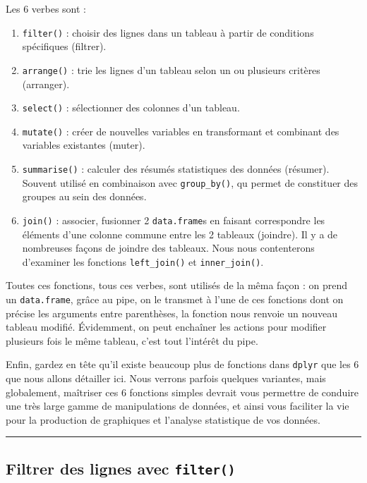 \documentclass[a4paperpaper,]{article}
\providecommand{\tightlist}{%
  \setlength{\itemsep}{0pt}\setlength{\parskip}{0pt}}
\theoremstyle{definition}
\theoremstyle{definition}
\theoremstyle{definition}
\theoremstyle{remark}
\begin{document}
Les 6 verbes sont :

\begin{enumerate}
\def\labelenumi{\arabic{enumi}.}
\tightlist
\item
  \texttt{filter()} : choisir des lignes dans un tableau à partir de
  conditions spécifiques (filtrer).
\item
  \texttt{arrange()} : trie les lignes d'un tableau selon un ou
  plusieurs critères (arranger).
\item
  \texttt{select()} : sélectionner des colonnes d'un tableau.
\item
  \texttt{mutate()} : créer de nouvelles variables en transformant et
  combinant des variables existantes (muter).
\item
  \texttt{summarise()} : calculer des résumés statistiques des données
  (résumer). Souvent utilisé en combinaison avec \texttt{group\_by()},
  qu permet de constituer des groupes au sein des données.
\item
  \texttt{join()} : associer, fusionner 2 \texttt{data.frame}s en
  faisant correspondre les éléments d'une colonne commune entre les 2
  tableaux (joindre). Il y a de nombreuses façons de joindre des
  tableaux. Nous nous contenterons d'examiner les fonctions
  \texttt{left\_join()} et \texttt{inner\_join()}.
\end{enumerate}

Toutes ces fonctions, tous ces verbes, sont utilisés de la mêma façon :
on prend un \texttt{data.frame}, grâce au pipe, on le transmet à l'une
de ces fonctions dont on précise les arguments entre parenthèses, la
fonction nous renvoie un nouveau tableau modifié. Évidemment, on peut
enchaîner les actions pour modifier plusieurs fois le même tableau,
c'est tout l'intérêt du pipe.

Enfin, gardez en tête qu'il existe beaucoup plus de fonctions dans
\texttt{dplyr} que les 6 que nous allons détailler ici. Nous verrons
parfois quelques variantes, mais globalement, maîtriser ces 6 fonctions
simples devrait vous permettre de conduire une très large gamme de
manipulations de données, et ainsi vous faciliter la vie pour la
production de graphiques et l'analyse statistique de vos données.

\begin{center}\rule{0.5\linewidth}{\linethickness}\end{center}

\subsection{\texorpdfstring{Filtrer des lignes avec
\texttt{filter()}}{Filtrer des lignes avec filter()}}\label{filtrer-des-lignes-avec-filter}
\end{document}
